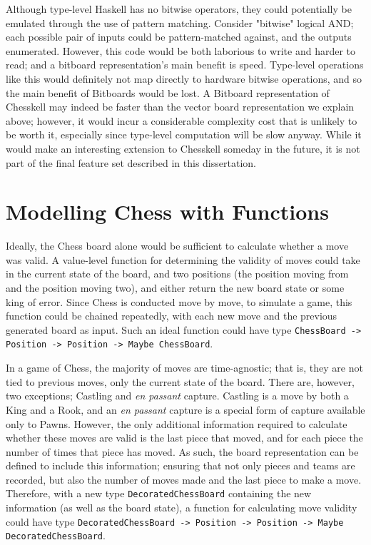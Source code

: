 \documentclass[12pt, a4paper, bibliography=totocnumbered]{scrreprt}
\newcommand{\inline}[1]{\lstinline[basicstyle=\ttfamily\footnotesize]{#1}}
\begin{document}
Although type-level Haskell has no bitwise operators, they could potentially be emulated through the use of pattern matching. Consider "bitwise" logical AND; each possible pair of inputs could be pattern-matched against, and the outputs enumerated. However, this code would be both laborious to write and harder to read; and a bitboard representation's main benefit is speed. Type-level operations like this would definitely not map directly to hardware bitwise operations, and so the main benefit of Bitboards would be lost. A Bitboard representation of Chesskell may indeed be faster than the vector board representation we explain above; however, it would incur a considerable complexity cost that is unlikely to be worth it, especially since type-level computation will be slow anyway. While it would make an interesting extension to Chesskell someday in the future, it is not part of the final feature set described in this dissertation.

\section{Modelling Chess with Functions}

Ideally, the Chess board alone would be sufficient to calculate whether a move was valid. A value-level function for determining the validity of moves could take in the current state of the board, and two positions (the position moving from and the position moving two), and either return the new board state or some king of error. Since Chess is conducted move by move, to simulate a game, this function could be chained repeatedly, with each new move and the previous generated board as input. Such an ideal function could have type \inline{ChessBoard -> Position -> Position -> Maybe ChessBoard}.

In a game of Chess, the majority of moves are time-agnostic; that is, they are not tied to previous moves, only the current state of the board. There are, however, two exceptions; Castling and \emph{en passant} capture. Castling is a move by both a King and a Rook, and an \emph{en passant} capture is a special form of capture available only to Pawns. However, the only additional information required to calculate whether these moves are valid is the last piece that moved, and for each piece the number of times that piece has moved. As such, the board representation can be defined to include this information; ensuring that not only pieces and teams are recorded, but also the number of moves made and the last piece to make a move. Therefore, with a new type \inline{DecoratedChessBoard} containing the new information (as well as the board state), a function for calculating move validity could have type \inline{DecoratedChessBoard -> Position -> Position -> Maybe DecoratedChessBoard}.
\end{document}

